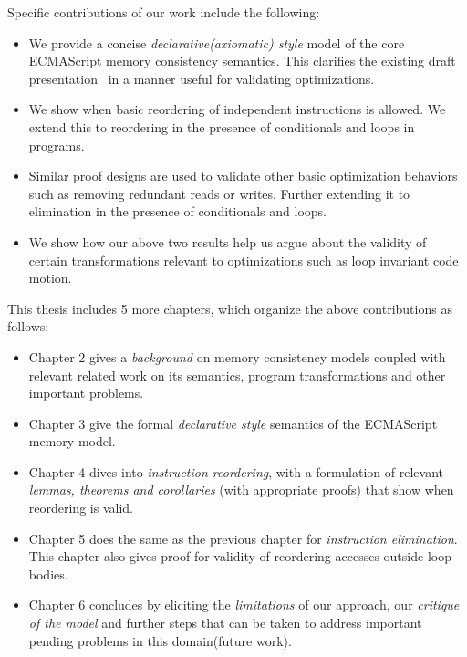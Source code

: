 Specific contributions of our work include the following:
\begin{itemize}
    \item We provide a concise \textit{declarative(axiomatic) style} model of the core ECMAScript memory consistency semantics. This clarifies the existing draft presentation~\cite{ECMA} in a manner useful for validating optimizations.
    \item We show when basic reordering of independent instructions is allowed. We extend this to reordering in the presence of conditionals and loops in programs.
    \item Similar proof designs are used to validate other basic optimization behaviors such as removing redundant reads or writes. Further extending it to elimination in the presence of conditionals and loops. 
    \item We show how our above two results help us argue about the validity of certain transformations relevant to optimizations such as loop invariant code motion. 
\end{itemize}

This thesis includes 5 more chapters, which organize the above contributions as follows:
\begin{itemize}
    \item Chapter 2 gives a \textit{background} on memory consistency models coupled with relevant related work on its semantics, program transformations and other important problems.
    \item Chapter 3 give the formal \textit{declarative style} semantics of the ECMAScript memory model.
    \item Chapter 4 dives into \textit{instruction reordering}, with a formulation of relevant \textit{lemmas, theorems and corollaries} (with appropriate proofs) that show when reordering is valid.
    \item Chapter 5 does the same as the previous chapter for \textit{instruction elimination}. This chapter also gives proof for validity of reordering accesses outside loop bodies. 
    \item Chapter 6 concludes by eliciting the \textit{limitations} of our approach, our \textit{critique of the model} and further steps that can be taken to address important pending problems in this domain(future work).
\end{itemize}
